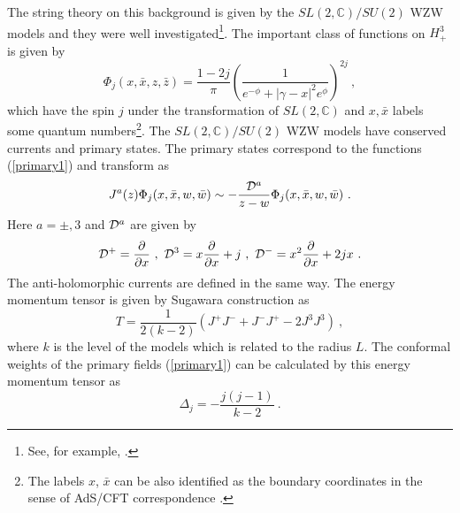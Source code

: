 \documentclass[a4paper,12pt]{article}
\newcommand{\bc}{\mathbb C}
\newcommand{\cD}{{\cal D}}
\begin{document}
The string theory on this background is given by the
$SL(2,\bc)/SU(2)$ WZW models and they were well investigated\footnote{
See, for example, \cite{Gawedzki}.}.
The important class of functions on $H^3_+$ is given by
\begin{equation}
 \Phi_j (x,\bar{x},z,\bar{z}) = \frac{1 - 2j}{\pi} \left(
 \frac{1}{e^{-\phi} + | \gamma - x | ^2 e^{\phi} }
\right)^{2 j} ~,
\label{primary1}
\end{equation} 
which have the spin $j$ under the transformation of $SL(2,\bc)$ and 
$x ,\bar{x}$ labels some quantum numbers\footnote{
The labels $x$, $\bar{x}$ can be also identified as the boundary
coordinates in the sense of AdS/CFT correspondence \cite{AdSCFT}.
}.
The $SL(2,\bc)/SU(2)$ WZW models have conserved currents and primary
states.
The primary states correspond to the functions (\ref{primary1}) and transform
as
\begin{equation}
 J^a (z) \Phi_j (x,\bar{x},w,\bar{w}) \sim 
 - \frac{\cD^a}{z-w} \Phi_j (x,\bar{x},w,\bar{w}) ~.
\label{primary2}
\end{equation}  
Here $a  = \pm, 3$ and $\cD^a$ are given by
\begin{equation}
 \cD^+ = \frac{\partial}{\partial x} ~,~
 \cD^3 = x \frac{\partial}{\partial x} + j ~,~
 \cD^- = x^2 \frac{\partial}{\partial x} + 2jx ~.
\end{equation} 
The anti-holomorphic currents are defined in the same way.
The energy momentum tensor is given by Sugawara construction as
\begin{equation}
 T = \frac{1}{2(k-2)} ( J^+ J^- + J^- J^+ - 2 J^3 J^3 ) ~,
\end{equation}
where $k$ is the level of the models which is related to the radius $L$. 
The conformal weights of the primary fields
(\ref{primary1}) can be calculated by this energy momentum tensor as
\begin{equation}
 \Delta_j = - \frac{j(j-1)}{k-2}~. 
\end{equation}
\end{document}
